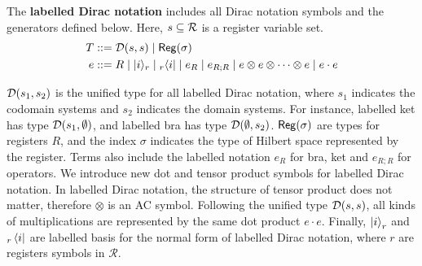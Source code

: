 
\begin{definition}
  The \textbf{labelled Dirac notation} includes all Dirac notation symbols and the generators defined below.
  Here, $s\subseteq \mathcal{R}$ is a register variable set.
  \begin{align*}
    T & ::= \mathcal{D}(s,s) \mid \mathsf{Reg}(\sigma) \\
    e & ::= R \mid |i\rangle_r \mid {}_r\langle i| \mid e_R \mid e_{R;R} \mid
    e \otimes e \otimes \cdots \otimes e \mid e \cdot e
  \end{align*}
\end{definition}
$\mathcal{D}(s_1, s_2)$ is the unified type for all labelled Dirac notation, where $s_1$ indicates the codomain systems and $s_2$ indicates the domain systems. For instance, labelled ket has type $\mathcal{D}(s_1, \emptyset)$, and labelled bra has type $\mathcal{D}(\emptyset, s_2)$.
$\mathsf{Reg}(\sigma)$ are types for registers $R$, and the index $\sigma$ indicates the type of Hilbert space represented by the register.
Terms also include the labelled notation $e_R$ for bra, ket and $e_{R;R}$ for operators. We introduce new dot and tensor product symbols for labelled Dirac notation. In labelled Dirac notation, the structure of tensor product does not matter, therefore $\otimes$ is an AC symbol.
Following the unified type $\mathcal{D}(s,s)$, all kinds of multiplications are represented by the same dot product $e \cdot e$.
Finally, $\ket{i}_r$ and ${}_r\bra{i}$ are labelled basis for the normal form of labelled Dirac notation, where $r$ are registers symbols in $\mathcal{R}$. 

